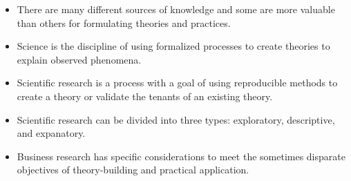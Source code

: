 \begin{itemize}
	\item There are many different sources of knowledge and some are more valuable than others for formulating theories and practices.

	\item Science is the discipline of using formalized processes to create theories to explain observed phenomena.

	\item Scientific research is a process with a goal of using reproducible methods to create a theory or validate the tenants of an existing theory.

	\item Scientific research can be divided into three types: exploratory, descriptive, and expanatory.

	\item Business research has specific considerations to meet the sometimes disparate objectives of theory-building and practical application.
\end{itemize}
